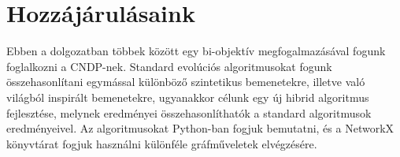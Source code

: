 \section{Hozzájárulásaink}\label{sec:HOZZAJARULASAINK}

Ebben a dolgozatban többek között egy bi-objektív megfogalmazásával fogunk foglalkozni a CNDP-nek.
Standard evolúciós algoritmusokat fogunk összehasonlítani egymással különböző szintetikus bemenetekre, illetve való világból inspirált bemenetekre,
ugyanakkor célunk egy új hibrid algoritmus fejlesztése, melynek eredményei összehasonlíthatók a standard algoritmusok eredményeivel.
Az algoritmusokat Python-ban fogjuk bemutatni, és a NetworkX könyvtárat \cite{hagberg2008exploring} fogjuk használni különféle gráfműveletek elvégzésére.
